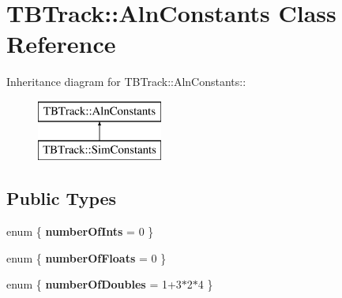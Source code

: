 \section{TBTrack::AlnConstants Class Reference}
\label{classTBTrack_1_1AlnConstants}
Inheritance diagram for TBTrack::AlnConstants::\begin{figure}[H]
\begin{center}
\leavevmode
\includegraphics[height=2cm]{classTBTrack_1_1AlnConstants}
\end{center}
\end{figure}
\subsection*{Public Types}
\begin{DoxyCompactItemize}
\item 
enum \{ {\bfseries numberOfInts} = 0
 \}
\item 
enum \{ {\bfseries numberOfFloats} = 0
 \}
\item 
enum \{ {\bfseries numberOfDoubles} = 1+3$\ast$2$\ast$4
 \}
\end{DoxyCompactItemize}
